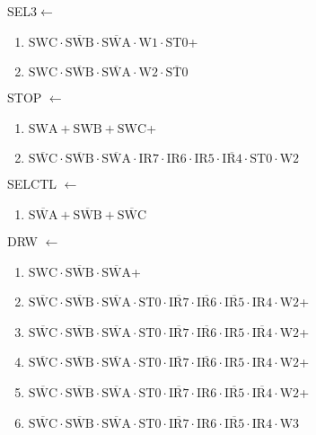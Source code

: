 \documentclass[UTF8]{ctexart}
\begin{document}
\noindent SEL3$\leftarrow$
\begin{enumerate}[\indent\indent]
	\item$\text{SWC}\cdot\overline{\text{SWB}}\cdot\overline{\text{SWA}}\cdot\text{W1}\cdot\text{ST0}$+
	\item$\text{SWC}\cdot\overline{\text{SWB}}\cdot\overline{\text{SWA}}\cdot\text{W2}\cdot\overline{\text{ST0}}$
\end{enumerate}
\noindent STOP
$\leftarrow$
\begin{enumerate}[\indent\indent]
	\item$\text{SWA}+\text{SWB}+\text{SWC}$+
	\item$\overline{\text{SWC}}\cdot\overline{\text{SWB}}\cdot\overline{\text{SWA}}\cdot {\text{IR7}} \cdot {\text{IR6}}\cdot {\text{IR5}}\cdot \overline{\text{IR4}} \cdot \text{ST0}\cdot \text{W2}$
\end{enumerate}
\noindent SELCTL
$\leftarrow$
\begin{enumerate}[\indent\indent]
	\item$\overline{\text{SWA}}+\overline{\text{SWB}}+\overline{\text{SWC}}$
\end{enumerate}
\noindent DRW
$\leftarrow$
\begin{enumerate}[\indent\indent]
	\item$\text{SWC}\cdot\overline{\text{SWB}}\cdot\overline{\text{SWA}}$+
	\item$\overline{\text{SWC}}\cdot\overline{\text{SWB}}\cdot\overline{\text{SWA}}\cdot\text{ST0}\cdot\overline{\text{IR7}}\cdot\overline{\text{IR6}}\cdot\overline{\text{IR5}}\cdot\text{IR4}\cdot\text{W2}$+
	\item$\overline{\text{SWC}}\cdot\overline{\text{SWB}}\cdot\overline{\text{SWA}}\cdot\text{ST0}\cdot\overline{\text{IR7}}\cdot\overline{\text{IR6}}\cdot{\text{IR5}}\cdot\overline{\text{IR4}}\cdot\text{W2}$+
	\item$\overline{\text{SWC}}\cdot\overline{\text{SWB}}\cdot\overline{\text{SWA}}\cdot\text{ST0}\cdot\overline{\text{IR7}}\cdot\overline{\text{IR6}}\cdot\text{IR5}\cdot\text{IR4}\cdot\text{W2}$+
	\item$\overline{\text{SWC}}\cdot\overline{\text{SWB}}\cdot\overline{\text{SWA}}\cdot\text{ST0}\cdot\overline{\text{IR7}}\cdot{\text{IR6}}\cdot\overline{\text{IR5}}\cdot\overline{\text{IR4}}\cdot\text{W2}$+
	\item$\overline{\text{SWC}}\cdot\overline{\text{SWB}}\cdot\overline{\text{SWA}}\cdot\text{ST0}\cdot\overline{\text{IR7}}\cdot{\text{IR6}}\cdot\overline{\text{IR5}}\cdot{\text{IR4}}\cdot\text{W3}$
\end{enumerate}
\end{document}
